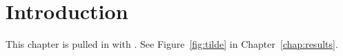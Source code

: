 \chapter{Introduction}

This chapter is pulled in with \verb||. See Figure~\ref{fig:tilde} in Chapter~\ref{chap:results}.
